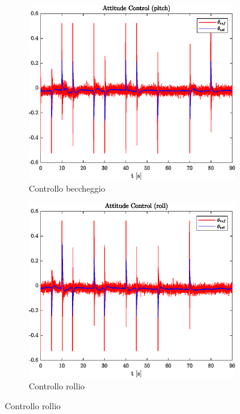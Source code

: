 \begin{figure}
	\centering
	\begin{subfigure}{0.45\textwidth}
		\centering
		\includegraphics[width=1\textwidth]{Simulazioni/Figure/PID/SNAKE/AttitudeControlPitch}
		\caption{Controllo beccheggio}
	\end{subfigure}
	\hfill
	\begin{subfigure}{0.45\textwidth}
		\centering
		\includegraphics[width=1\textwidth]{Simulazioni/Figure/PID/SNAKE/AttitudeControlRoll}
		\caption{Controllo rollio}

\end{subfigure}
\end{figure}
